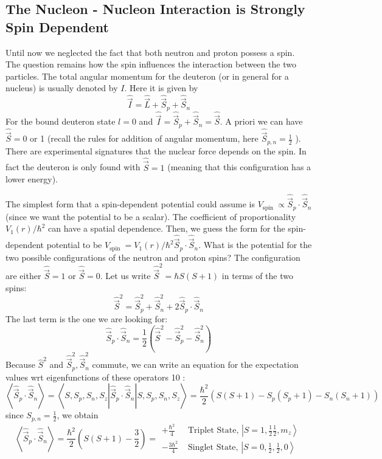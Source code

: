 \subsection{ The Nucleon - Nucleon Interaction is Strongly Spin Dependent}
Until now we neglected the fact that both neutron and proton possess a spin. The question remains how the spin influences the interaction between the two particles. The total angular momentum for the deuteron (or in general for a nucleus) is usually denoted by $I$. Here it is given by
$$
\hat{\vec{I}}=\hat{\vec{L}}+\hat{\vec{S}}_{p}+\hat{\vec{S}}_{n}
$$
For the bound deuteron state $l=0$ and $\hat{\vec{I}}=\hat{\vec{S}}_{p}+\hat{\vec{S}}_{n}=\hat{\vec{S}}$. A priori we can have $\hat{\vec{S}}=0$ or 1 (recall the rules for addition of angular momentum, here $\hat{\vec{S}}_{p, n}=\frac{1}{2}$ ).
There are experimental signatures that the nuclear force depends on the spin. In fact the deuteron is only found with $\hat{\vec{S}}=1$ (meaning that this configuration has a lower energy).\\
\par The simplest form that a spin-dependent potential could assume is $V_{\text {spin }} \propto \hat{\vec{S}}_{p} \cdot \hat{\vec{S}}_{n}$ (since we want the potential to be a scalar). The coefficient of proportionality $V_{1}(r) / \hbar^{2}$ can have a spatial dependence. Then, we guess the form for the spin-dependent potential to be $V_{\text {spin }}=V_{1}(r) / \hbar^{2} \hat{\vec{S}}_{p} \cdot \hat{\vec{S}}_{n}$. What is the potential for the two possible configurations of the neutron and proton spins?
The configuration are either $\hat{\vec{S}}=1$ or $\hat{\vec{S}}=0$. Let us write $\hat{\vec{S}}^{2}=\hbar S(S+1)$ in terms of the two spins:
$$
\hat{\vec{S}}^{2}=\hat{\vec{S}}_{p}^{2}+\hat{\vec{S}}_{n}^{2}+2 \hat{\vec{S}}_{p} \cdot \hat{\vec{S}}_{n}
$$
The last term is the one we are looking for:
$$
\hat{\vec{S}}_{p} \cdot \hat{\vec{S}}_{n}=\frac{1}{2}\left(\hat{\vec{S}}^{2}-\hat{\vec{S}}_{p}^{2}-\hat{\vec{S}}_{n}^{2}\right)
$$
Because $\hat{S}^{2}$ and $\hat{\vec{S}}_{p}^{2}, \hat{\vec{S}}_{n}^{2}$ commute, we can write an equation for the expectation values wrt eigenfunctions of these operators 10 :
$$
\left\langle\hat{\vec{S}}_{p} \cdot \hat{\vec{S}}_{n}\right\rangle=\left\langle S, S_{p}, S_{n}, S_{z}\left|\hat{\vec{S}}_{p} \cdot \hat{\vec{S}}_{n}\right| S, S_{p}, S_{n}, S_{z}\right\rangle=\frac{\hbar^{2}}{2}\left(S(S+1)-S_{p}\left(S_{p}+1\right)-S_{n}\left(S_{n}+1\right)\right)
$$
since $S_{p, n}=\frac{1}{2}$, we obtain
$$
\left\langle\hat{\vec{S}}_{p} \cdot \hat{\vec{S}}_{n}\right\rangle=\frac{\hbar^{2}}{2}\left(S(S+1)-\frac{3}{2}\right)=\begin{array}{ll}
+\frac{\hbar^{2}}{4} & \text { Triplet State, }\left|S=1, \frac{1}{2} \frac{1}{2}, m_{z}\right\rangle \\
-\frac{3 \hbar^{2}}{4} & \text { Singlet State, }\left|S=0, \frac{1}{2}, \frac{1}{2}, 0\right\rangle
\end{array}
$$
